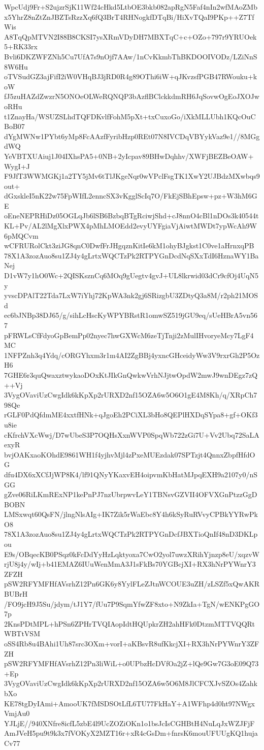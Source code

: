 WpcUdj9Fr+S2ujzrSjK11Wf24cHkd5LtbOE3bkb082apRgN5Faf4nIn2wfMAoZMb
x5YhrZ8nZtZnJBZTsRzzXq6fQ3BrT4RHNogkfDTqBi/HiXvTQaI9PKp++Z7TfWis
A8TqQpMTVN2I88B8CKSI7ysXRmVDyDH7MBXTqC+c+OZo+797r9YRUOek5+RK33rx
Bvli6DKZWFZNh5Cu7UfA7s9nOjf7AAw/1nCvKkmbThBKDOOIVODz/LZiNnS8W6Hu
oTVSudGZ3ajFifI2iW0VHqBJ3jRD0R4g89OThi6iW+qJKvzsfPGB47RWouku+koW
fJ5zuHAZdZwzrN5ONOeOLWeRQNQP3bAzflBClckkdmRH6JqSovwOgEoJXOJwoRHu
t1ZnayHa/WSUZSLhdTQFDKvlfFohM5pXt+txCuxoGo/iXkMLLUbh1KQcOuCBoB07
dYgMWNw1PYbt6yMp8FcAAzfFyribHzp0REt07N8IVCDqVBYykVaz9e1//8MGgdWQ
YeVBTXUAiuj1J04IXhsPA5+0NB+2yIcpav89BHwDqhhv/XWFjBEZBeOAW+WygI+J
F9JfT3WWMGKj1a2TY5jMv6tTlJKgeNqr0wVPclFsgTK1XwY2UJBdzMXwbqs9out+
dGxskleI5nK22w75FpWIfL2enncSX3vKgglScIq7O/FkEjSBhEpsw+pz+W3hM6GE
oEneNEPRHiDz05OGLqJb6lSB6BzbqBTgRciwjShd+cJ8nnO4cBl1nDOs3k40544t
KL+Pv/AL2lMgXlxPWX4pMhLMOEdd2evyUYFgiaVjAiwtMWDt7ypWcAh9W6pMQCvm
wCFRURolCkt3ziJG8qnC0DwfFrJHgqznKitIe6kM1ohyBJgkst1C0ve1aHrnxqPB
78X1A3zozAuo8su1ZJ4y4gLrtxWQCTzPk2RTPYGnDcdNqSXxTdI6HznaWY1BaNej
D1vW7y1hO0Wc+2QISKsznCq6MOq9gUegtv4gvJ+UL8lkrwid03dCr9cfOj4UqN5y
yvscDPAlT22Tda7LxW7iYhj72KpWA3nk2gj6SRizgbU3ZDtyQ3a8M/r2ph21MOSd
ec6bJNBp38DJ65/g/sihLcHscKyWPYBRstR1omwSZ519jGU9eq/sUeHBrA5vn567
pFRWLsCfFdyoGpBemPp02nyec7hwGXWcM6zeTjTnji2zMulIHvoryeMcy7LgF4MC
1NFPZnh3q4Ydq/cORGYhxm3r1m4AI2ZgBBj4yxncGHceidyWw3V9rxrGh2P5OzH6
7GHE6r3quQwaxztwykaoDOxKtJIkGnQwkwVrhNJjtwOpdW2mwJ9wnDEgz7zQ++Vj
3VygOVaviUzCwgIdk6kKpXp2rURXD2nf15OZA6w5O6O1gE4M8Kh/q/XRpCh798Qe
rGLF0PdQfdmME4xxtfHNk+qJgoEh2PCiXL3bHo8QEPlHXDqSYpa8+gf+OKf3u8ie
cKfrchVXcWwj/D7wUbeS3P7OQHsXxnWVP0SpqWb722zGi7U+Vv2Ubq72SaLAexyR
bvjOAKxaoKOhdE9861WH1f4yjhvMjl4zPxeMUEzdak07SPTzjt4QnnxZbpfHfdOG
dfu4DX6xXCfJjWP8K4/lf91QNyYKaxvEH4oipvmKbHatMJpqEXH9a2107y0/nSGG
gZve06RiLKmRExNP1kePnPJ7nzUbrpwvLeY1TBNsvGZVII4OFVXGnPtzzGgDBOBN
LMSxwqt60QsFN/jlngNlsAIg+IK7Zik5rWaEbc8Y4h6kSyRuRVvyCPBkYYRwPkO8
78X1A3zozAuo8su1ZJ4y4gLrtxWQCTzPk2RTPYGnDcfJBXTioQnIf48nD3DKLpou
E9s/OBqecKB0PSqz0kFcDdYyHzLqktyoxa7CwO2yol7uwzXRihYjnzp8eU/xqzvW
rjU8j4y/wIj+b41EMAZ6IUuWenMmA3J1sFkBs70YGBcjXI+RX3hNrPYWnrY3ZFZH
pSW2RFYMFHfAVsrhZ12Pn6GK6y8YylFLeZJtnWCOUE3uZH/zLSZf5xQwAKRBUBrH
/FO9jcH9J5Su/jdym/tJ1Y7/fUu7P9SqmYfwZF8xto+N9ZkIa+TgN/wENKPgGO7p
2KnsPDtMPL+hPSn6ZPHrTVQIAopIdtHQUpkrZH2ahHFk0DtzmMTTVQQRtWBTtVSM
oSS4Rb8u4BAhi1Uh87src3OXm+vorI+aKBsvR8ufKkcjXI+RX3hNrPYWnrY3ZFZH
pSW2RFYMFHfAVsrhZ12Pn3liWiL+o0UPbzHcDVfOa2jZ+lQe9Gw7G3oE09Q73+Ep
3VygOVaviUzCwgIdk6kKpXp2rURXD2nf15OZA6w5O6M8JlCFCXJvSZOs4ZahkbXo
KE78tgDyIAmi+AmooUK7fMSDSOtLfL6TU77FkHaY+A1WFhp4d0ht97NWgxVmjAu0
YJLjE//940XNfre8icfL5zbE4l9UcZOZiOKn1o1bsJcIsCGHBtH4NuLqJxWZJFjF
AmJVeH5pu9t9k3x7fVOKyX2MZT16r+xR4cGsDm+fnrsK6mouUFUUgKQ1hujaCv77
